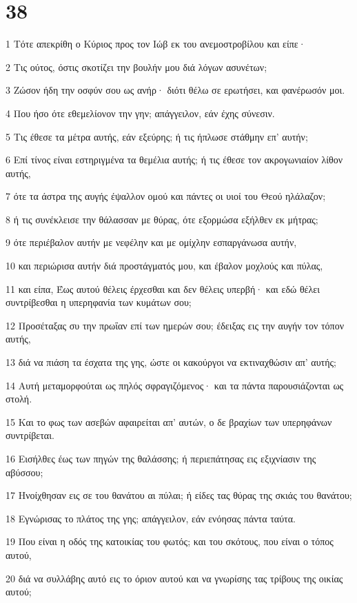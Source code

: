 \chapter{38}

\par 1 Τότε απεκρίθη ο Κύριος προς τον Ιώβ εκ του ανεμοστροβίλου και είπε·
\par 2 Τις ούτος, όστις σκοτίζει την βουλήν μου διά λόγων ασυνέτων;
\par 3 Ζώσον ήδη την οσφύν σου ως ανήρ· διότι θέλω σε ερωτήσει, και φανέρωσόν μοι.
\par 4 Που ήσο ότε εθεμελίονον την γην; απάγγειλον, εάν έχης σύνεσιν.
\par 5 Τις έθεσε τα μέτρα αυτής, εάν εξεύρης; ή τις ήπλωσε στάθμην επ' αυτήν;
\par 6 Επί τίνος είναι εστηριγμένα τα θεμέλια αυτής; ή τις έθεσε τον ακρογωνιαίον λίθον αυτής,
\par 7 ότε τα άστρα της αυγής έψαλλον ομού και πάντες οι υιοί του Θεού ηλάλαζον;
\par 8 ή τις συνέκλεισε την θάλασσαν με θύρας, ότε εξορμώσα εξήλθεν εκ μήτρας;
\par 9 ότε περιέβαλον αυτήν με νεφέλην και με ομίχλην εσπαργάνωσα αυτήν,
\par 10 και περιώρισα αυτήν διά προστάγματός μου, και έβαλον μοχλούς και πύλας,
\par 11 και είπα, Έως αυτού θέλεις έρχεσθαι και δεν θέλεις υπερβή· και εδώ θέλει συντρίβεσθαι η υπερηφανία των κυμάτων σου;
\par 12 Προσέταξας συ την πρωΐαν επί των ημερών σου; έδειξας εις την αυγήν τον τόπον αυτής,
\par 13 διά να πιάση τα έσχατα της γης, ώστε οι κακούργοι να εκτιναχθώσιν απ' αυτής;
\par 14 Αυτή μεταμορφούται ως πηλός σφραγιζόμενος· και τα πάντα παρουσιάζονται ως στολή.
\par 15 Και το φως των ασεβών αφαιρείται απ' αυτών, ο δε βραχίων των υπερηφάνων συντρίβεται.
\par 16 Εισήλθες έως των πηγών της θαλάσσης; ή περιεπάτησας εις εξιχνίασιν της αβύσσου;
\par 17 Ηνοίχθησαν εις σε του θανάτου αι πύλαι; ή είδες τας θύρας της σκιάς του θανάτου;
\par 18 Εγνώρισας το πλάτος της γης; απάγγειλον, εάν ενόησας πάντα ταύτα.
\par 19 Που είναι η οδός της κατοικίας του φωτός; και του σκότους, που είναι ο τόπος αυτού,
\par 20 διά να συλλάβης αυτό εις το όριον αυτού και να γνωρίσης τας τρίβους της οικίας αυτού;
